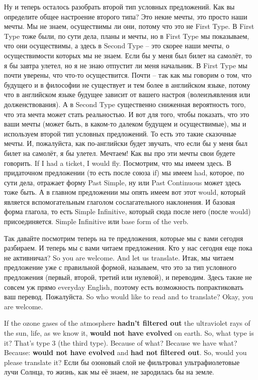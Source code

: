 \documentclass[main.tex]{subfiles}
\begin{document}
Ну и теперь осталось разобрать второй тип условных предложений.
Как вы определите общее настроение второго типа?
Это некие мечты, это просто наши мечты.
Мы не знаем, осуществимы ли они, потому что это не First Type.
В First Type тоже были, по сути дела, планы и мечты, но в First Type мы показываем, что они осуществимы, а здесь в Second Type -- это скорее наши мечты, о осуществимости которых мы не знаем.
Если бы у меня был билет на самолёт, то я бы завтра улетел, но я не знаю отпустит ли меня начальник.
В First Type мы почти уверены, что что-то осуществится.
Почти -- так как мы говорим о том, что будущего и в философии не существует и тем более в английском языке, потому что в английском языке будущее зависит от вашего настроя (волеизъявления или долженствования).
А в Second Type существенно сниженная вероятность того, что эта мечта может стать реальностью.
И вот для того, чтобы показать, что это ваши мечты (может быть, в каком-то далеком будущем и осуществимые), мы и используем второй тип условных предложений.
То есть это такие сказочные мечты.
И, пожалуйста, как по-английски будет звучать, что если бы у меня был билет на самолёт, я бы улетел.
Мечтаем!
Как вы про эти мечты свои будете говорить.
If I had a ticket, I would fly.
Посмотрим, что мы имеем здесь.
В придаточном предложении (то есть после союза if) мы имеем had, которое, по сути дела, отражает форму Past Simple, ну или Past Continuous может здесь тоже быть.
А в главном предложении мы опять имеем вот этот would, который является вспомогательным глаголом сослагательного наклонения.
И базовая форма глагола, то есть Simple Infinitive, который сюда после него (после would) присоединяется.
Simple Infinitive или base form of the verb.

\newpage
{}

Так давайте посмотрим теперь на те предложения, которые мы с вами сегодня разбираем.
И теперь мы с вами читаем предложения.
Кто у нас сегодня еще пока не активничал?
So you are welcome.
And let us translate.
Итак, мы читаем предложение уже с правильной формой, называем, что это за тип условного предложения (первый, второй, третий или нулевой), и переводим.
Здесь такие не совсем уж прямо everyday English, поэтому есть возможность попрактиковать ваш перевод.
Пожалуйста.
So who would like to read and to translate?
Okay, you are welcome.

If the ozone gases of the atmosphere \textbf{hadn't filtered out} the ultraviolet rays of the sun, life, as we know it, \textbf{would not have evolved} on earth.
So, what type is it?
That's type 3 (the third type).
Because of what?
Because we have what?
Because: \textbf{would not have evolved} and \textbf{had not filtered out}.
So, would you please translate it?
Если бы озоновый слой не фильтровал ультрафиолетовые лучи Солнца, то жизнь, как мы её знаем, не зародилась бы на земле.
\end{document}
